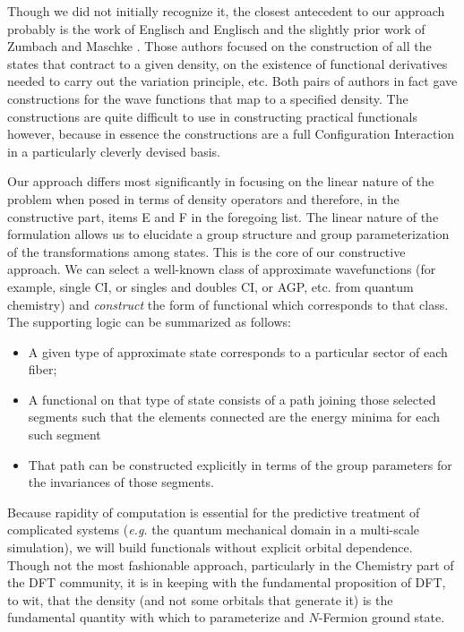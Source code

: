 \documentclass[nofootinbib,floatfix,aps,pra,preprint]{revtex4}
\begin{document}
\textrm{Though we did not initially recognize it, the closest antecedent to
our approach probably is the work of Englisch and Englisch \cite{Englisch}
and the slightly prior work of Zumbach and Maschke \cite{Zumbach}. Those
authors focused on the construction of all the states that contract to a
given density, on the existence of functional derivatives needed to carry
out the variation principle, etc. Both pairs of authors in fact gave
constructions for the wave functions that map to a specified density. The
constructions are quite difficult to use in constructing practical
functionals however, because in essence the constructions are a full
Configuration Interaction in a particularly cleverly devised basis. }

\textrm{Our approach differs most significantly in focusing on the linear
nature of the problem when posed in terms of density operators and
therefore, in the constructive part, items E and F in the foregoing list.
The linear nature of the formulation allows us to elucidate a group
structure and group parameterization of the transformations among states.
This is the core of our constructive approach. We can select a well-known
class of approximate wavefunctions (for example, single CI, or singles and
doubles CI, or AGP, etc. from quantum chemistry) and \emph{construct} the
form of functional which corresponds to that class. The supporting logic can
be summarized as follows:\vspace{-0.21cm} }

\begin{itemize}
\item \textrm{A given type of approximate state corresponds to a particular
sector of each fiber;\vspace{-0.21cm} }

\item \textrm{A functional on that type of state consists of a path joining
those selected segments such that the elements connected are the energy
minima for each such segment \vspace{-0.21cm} }

\item \textrm{That path can be constructed explicitly in terms of the group
parameters for the invariances of those segments. }
\end{itemize}

\textrm{Because rapidity of computation is essential for the predictive
treatment of complicated systems (\emph{e.g.} the quantum mechanical domain
in a multi-scale simulation), we will build functionals without explicit
orbital dependence. Though not the most fashionable approach, particularly
in the Chemistry part of the DFT community, it is in keeping with the
fundamental proposition of DFT, to wit, that the density (and not some
orbitals that generate it) is the fundamental quantity with which to
parameterize and $N$-Fermion ground state. }
\end{document}
